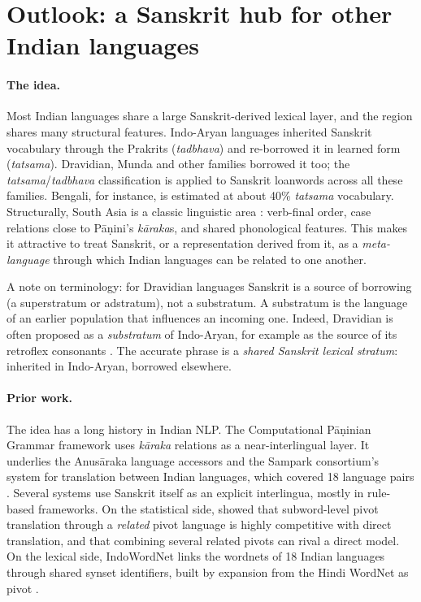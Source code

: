 
\section{Outlook: a Sanskrit hub for other Indian languages}\label{sec:outlook}

\paragraph{The idea.} Most Indian languages share a large Sanskrit-derived
lexical layer, and the region shares many structural features. Indo-Aryan
languages inherited Sanskrit vocabulary through the Prakrits
(\emph{tadbhava}) and re-borrowed it in learned form (\emph{tatsama}).
Dravidian, Munda and other families borrowed it too; the
\emph{tatsama}/\emph{tadbhava} classification is applied to Sanskrit
loanwords across all these families. Bengali, for instance, is estimated at %
about 40\% \emph{tatsama} vocabulary. Structurally, South Asia is a classic
linguistic area \citep{emeneau1956india}: verb-final order, case relations
close to Pāṇini's \emph{kāraka}s, and shared phonological features. This
makes it attractive to treat Sanskrit, or a representation derived from it,
as a \emph{meta-language} through which Indian languages can be related to
one another.

A note on terminology: for Dravidian languages Sanskrit is a source of
borrowing (a superstratum or adstratum), not a substratum. A substratum is
the language of an earlier population that influences an incoming one.
Indeed, Dravidian is often proposed as a \emph{substratum} of Indo-Aryan,
for example as the source of its retroflex consonants
\citep{emeneau1956india}. The accurate phrase is a \emph{shared Sanskrit
lexical stratum}: inherited in Indo-Aryan, borrowed elsewhere.

\paragraph{Prior work.} The idea has a long history in Indian NLP. The
Computational Pāṇinian Grammar framework \citep{bharati1995nlp} uses
\emph{kāraka} relations as a near-interlingual layer. It underlies the
Anusāraka language accessors and the Sampark consortium's system for
translation between Indian languages, which covered 18 language pairs
\citep{anthes2010automated}. Several systems use Sanskrit itself as an
explicit interlingua, mostly in rule-based frameworks. On the statistical
side, \citet{kunchukuttan2017utilizing} showed that subword-level pivot
translation through a \emph{related} pivot language is highly competitive
with direct translation, and that combining several related pivots can
rival a direct model. On the lexical side, IndoWordNet links the wordnets
of 18 Indian languages through shared synset identifiers, built by
expansion from the Hindi WordNet as pivot \citep{bhattacharyya2010indowordnet}.

